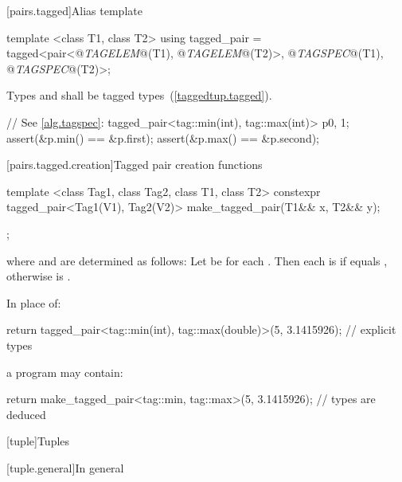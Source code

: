 {\color{newclr}
[pairs.tagged]{Alias template }

\begin{codeblock}
template <class T1, class T2>
using tagged_pair = tagged<pair<@\textit{TAGELEM}@(T1), @\textit{TAGELEM}@(T2)>,
                           @\textit{TAGSPEC}@(T1), @\textit{TAGSPEC}@(T2)>;
\end{codeblock}

\pnum Types   and  shall be tagged types~(\ref{taggedtup.tagged}).

\pnum \enterexample
\begin{codeblock}
// See \ref{alg.tagspec}:
tagged_pair<tag::min(int), tag::max(int)> p{0, 1};
assert(&p.min() == &p.first);
assert(&p.max() == &p.second);
\end{codeblock}
\exitexample


[pairs.tagged.creation]{Tagged pair creation functions}

%
\begin{itemdecl}
template <class Tag1, class Tag2, class T1, class T2>
  constexpr tagged_pair<Tag1(V1), Tag2(V2)> make_tagged_pair(T1&& x, T2&& y);
\end{itemdecl}

\begin{itemdescr}
\pnum
\returns {};

where  and  are determined as follows: Let  be
 for each . Then each  is 
if  equals , otherwise  is
.

\pnum
\enterexample
In place of:

\begin{codeblock}
  return tagged_pair<tag::min(int), tag::max(double)>(5, 3.1415926);   // explicit types
\end{codeblock}

a \Cpp program may contain:

\begin{codeblock}
  return make_tagged_pair<tag::min, tag::max>(5, 3.1415926);           // types are deduced
\end{codeblock}
\exitexample
\end{itemdescr}
}

[tuple]{Tuples}

[tuple.general]{In general}

